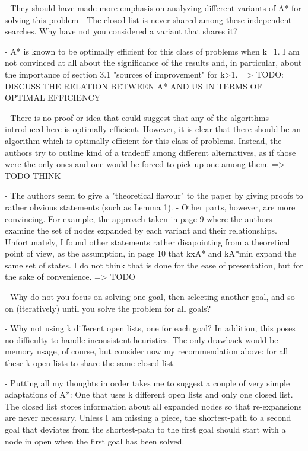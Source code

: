 -  They should have made   more emphasis on analyzing different variants of A* for solving
this problem
  - The closed list is never shared among these independent searches. Why have not you
considered a variant that shares it?

- A* is known to be optimally efficient for this class of
  problems when k=1. I am not convinced at all about the significance
  of the results and, in particular, about the importance of section
  3.1 "sources of improvement" for k>1.  => TODO: DISCUSS THE RELATION BETWEEN A* AND US IN TERMS OF OPTIMAL EFFICIENCY
  
  - There is no proof or idea that could suggest that any of the
  algorithms introduced here is optimally efficient. However, it is
  clear that there should be an algorithm which is optimally
efficient for this class of problems. Instead, the authors try to outline
kind of a tradeoff among different alternatives, as if those were the
  only ones and one would be forced to pick up one among them. => TODO THINK

- The authors seem to give a "theoretical flavour" to the paper by giving proofs to rather obvious
statements (such as Lemma 1). 
- Other parts, however, are more convincing. For
  example, the approach taken in page 9 where the authors examine the
  set of nodes expanded by each variant and their relationships. Unfortunately, I found other statements rather disapointing from a theoretical point of view, as the assumption, in page 10 that kxA* and kA*min expand the same set of states. 
  I do not   think that is done for the ease of presentation, but for the sake
of convenience. => TODO 

- Why do not you focus on solving one goal, then selecting another goal, and so
  on (iteratively) until you solve the problem for all goals?

- Why not using k different open lists, one for each goal? In
  addition, this poses no difficulty to handle inconsistent
  heuristics. The only drawback would be memory usage, of course, but
  consider now my recommendation above: for all these k open lists to
  share the same closed list.
  
- Putting all my thoughts in order takes me to suggest a couple of
  very simple adaptations of A*:
  One that uses k different open lists and only one closed list. The
  closed list stores information about all expanded nodes so that
  re-expansions are never necessary. Unless I am missing a piece, the
  shortest-path to a second goal that deviates from the shortest-path
  to the first goal should start with a node in open when the first
  goal has been solved.

